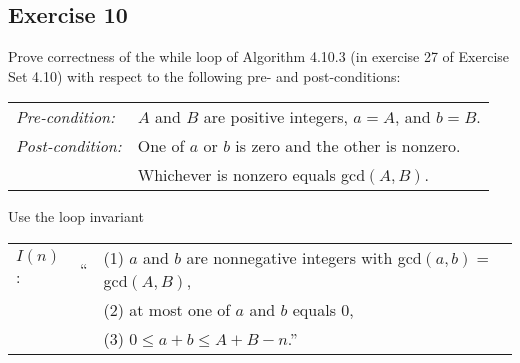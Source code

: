 \documentclass[14pt]{extarticle}
\begin{document}
\subsection{Exercise 10}
Prove correctness of the while loop of Algorithm 4.10.3 (in exercise 27 of Exercise Set 4.10) with respect to the
following pre- and post-conditions:

\begin{tabular}{ll}
    {\it Pre-condition:}  & $A$ and $B$ are positive integers, $a = A$, and $b = B$. \\
    {\it Post-condition:} & One of $a$ or $b$ is zero and the other is nonzero.      \\
                          & Whichever is nonzero equals gcd$(A, B)$.
\end{tabular}

Use the loop invariant

\begin{tabular}{lcl}
    $I(n)$: & `` & (1) $a$ and $b$ are nonnegative integers with gcd$(a, b) = $ gcd$(A, B)$, \\
            &    & (2) at most one of $a$ and $b$ equals $0$,                                \\
            &    & (3) $0 \leq a + b \leq A + B - n$.''
\end{tabular}
\end{document}
